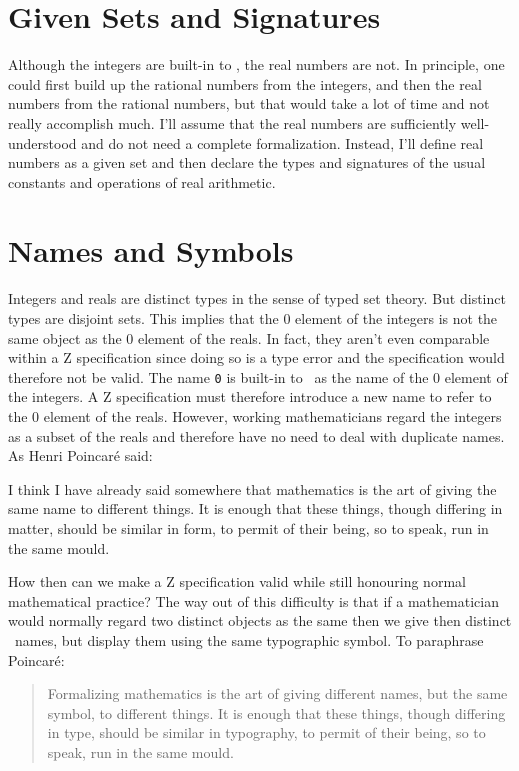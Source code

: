 \documentclass[11pt, oneside]{article}
\begin{document}
\section{Given Sets and Signatures}

Although the integers are built-in to \Zed, the real numbers are not.
In principle, one could first build up the rational numbers from the integers,
and then the real numbers from the rational numbers, but that would take a lot of time and not really
accomplish much.
I'll assume that the real numbers are sufficiently well-understood and do not need a complete formalization.
Instead, I'll define real numbers as a given set and then declare the types and signatures of the usual constants and operations of real arithmetic.

\section{Names and Symbols}

Integers and reals are distinct types in the sense of typed set theory.
But distinct types are disjoint sets.
This implies that the $0$ element of the integers is not the same object as the $0$ element of the reals.
In fact, they aren't even comparable within a Z specification since doing so is a type error and the 
specification would therefore not be valid.
The name \texttt{0} is built-in to \Zed\  as the name of the $0$ element of the integers.
A Z specification must therefore introduce a new name to refer to the $0$ element of the reals.
However, working mathematicians regard the integers as a subset of the reals and therefore have no need to deal with duplicate names.
As Henri Poincar\'{e} \cite{poincare-fm} said:
\begin{displayquote}
I think I have already said somewhere that mathematics is the art of giving the same name to different things. 
It is enough that these things, though differing in matter, should be similar in form, to permit of their being, so to speak, run in the same mould.\end{displayquote}

How then can we make a Z specification valid while still honouring normal mathematical practice?
The way out of this difficulty is that if a mathematician would normally regard two distinct objects as the same
then we give then distinct \Zed\  names, but display them using the same typographic symbol.
To paraphrase Poincar\'{e}:
\begin{quote}
Formalizing mathematics is the art of giving different names, but the same symbol, to different things. 
It is enough that these things, though differing in type, should be similar in typography, 
to permit of their being, so to speak, run in the same mould.
\end{quote}
\end{document}
